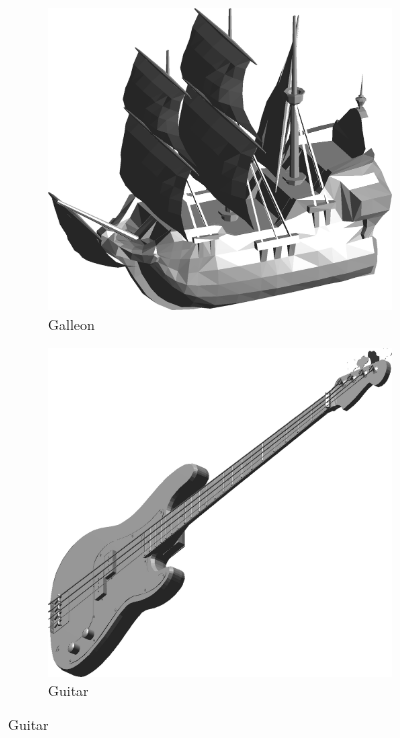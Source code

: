 \begin{figure}
\begin{subfigure}[t]{0.19\linewidth}
		\includegraphics[width=1\linewidth]{./fig/eval/11galleon.png}  
		\caption{Galleon} 	
	\end{subfigure}
	\begin{subfigure}[t]{0.19\linewidth} \centering
		\includegraphics[width=1\linewidth]{./fig/eval/12guitar.png}  
		\caption{Guitar} 	
	\end{subfigure}

\end{figure}
